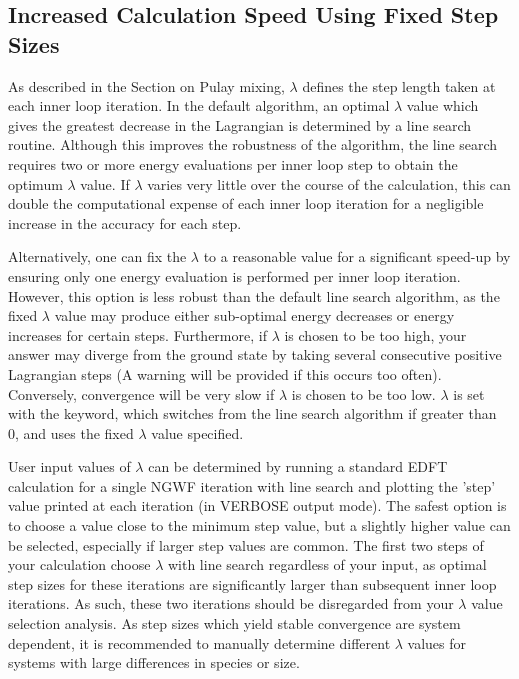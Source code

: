 \documentclass[letterpaper,10pt,english]{sphinxmanual}
\begin{document}
\subsection{Increased Calculation Speed Using Fixed Step Sizes}
\label{\detokenize{onetep_edft_documentation:increased-calculation-speed-using-fixed-step-sizes}}
As described in the Section on Pulay mixing, \(\lambda\) defines the step
length taken at each inner loop iteration. In the default algorithm, an
optimal \(\lambda\) value which gives the greatest decrease in the
Lagrangian is determined by a line search routine. Although this
improves the robustness of the algorithm, the line search requires two
or more energy evaluations per inner loop step to obtain the optimum
\(\lambda\) value. If \(\lambda\) varies very little over the
course of the calculation, this can double the computational expense of
each inner loop iteration for a negligible increase in the accuracy for
each step.

Alternatively, one can fix the \(\lambda\) to a reasonable value for
a significant speed-up by ensuring only one energy evaluation is
performed per inner loop iteration. However, this option is less robust
than the default line search algorithm, as the fixed \(\lambda\)
value may produce either sub-optimal energy decreases or energy
increases for certain steps. Furthermore, if \(\lambda\) is chosen
to be too high, your answer may diverge from the ground state by taking
several consecutive positive Lagrangian steps (A warning will be
provided if this occurs too often). Conversely, convergence will be very
slow if \(\lambda\) is chosen to be too low. \(\lambda\) is set
with the  keyword, which switches from the line
search algorithm if greater than 0, and uses the fixed \(\lambda\)
value specified.

User input values of \(\lambda\) can be determined by running a
standard EDFT calculation for a single NGWF iteration with line search
and plotting the ’step’ value printed at each iteration (in VERBOSE
output mode). The safest option is to choose a value close to the
minimum step value, but a slightly higher value can be selected,
especially if larger step values are common. The first two steps of your
calculation choose \(\lambda\) with line search regardless of your
input, as optimal step sizes for these iterations are significantly
larger than subsequent inner loop iterations. As such, these two
iterations should be disregarded from your \(\lambda\) value
selection analysis. As step sizes which yield stable convergence are
system dependent, it is recommended to manually determine different
\(\lambda\) values for systems with large differences in species or
size.
\end{document}
